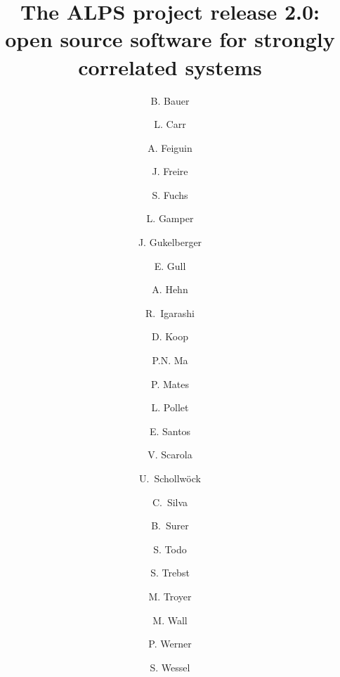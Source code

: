 \documentclass[3p,twocolumn]{elsarticle}
\begin{document}
\begin{frontmatter}

\title{The ALPS project release 2.0: \\ open source software for strongly correlated systems}

\author[eth]{B. Bauer} 
\author[colorado]{L. Carr} 
\author[wyoming]{A. Feiguin} 
\author[utah]{J. Freire} 
\author[goettingen]{S. Fuchs} 
\author[eth]{L. Gamper} 
\author[eth]{J. Gukelberger} 
\author[columbia]{E. Gull} 
\author[eth]{A. Hehn} 
\author[japan]{R.~Igarashi} 
\author[utah]{D. Koop} 
\author[eth]{P.N. Ma} 
\author[eth,utah]{P. Mates} 
\author[harvard,eth]{L. Pollet} 
\author[brazil,utah]{E. Santos} 
\author[virginia]{V. Scarola} 
\author[lmu]{U.~Schollw\"ock} 
\author[utah]{C.~Silva} 
\author[eth]{B.~Surer} 
\author[tokyo]{S. Todo} 
\author[stationq]{S. Trebst} 
\author[eth]{M. Troyer}
\author[Colorado]{M. Wall} 
\author[eth]{P. Werner} 
\author[rwth,stuttgart]{S. Wessel} 

\address[eth]{Theoretische Physik, ETH Zurich, 8093 Zurich, Switzerland}
\address[colorado] {}
\address[wyoming]{}
\address[utah]{}
\address[goettingen]{Institut f\"ur Theoretische Physik, Georg-August-Universit\"{a}t G\"{o}ttingen, G\"{o}ttingen, Germany}
\address[columbia]{Columbia University, New York, NY 10027, USA}
\address[harvard]{} 
\address[brazil]{} 
\address[virginia]{}
\address[lmu]{}
\address[tokyo]{Department of Applied Physics, University of Tokyo, 113-8656 Tokyo, Japan}
\address[stationq]{Microsoft Research, Station Q, University of California, Santa Barbara, CA 93106, USA}
\address[rwth]{}
\address[stuttgart]{Institut f\"ur Theoretische Physik III, Universit\"at Stuttgart, Pfaffenwaldring 57, D-70550 Stuttgart, Germany}


\end{frontmatter}
\end{document}
